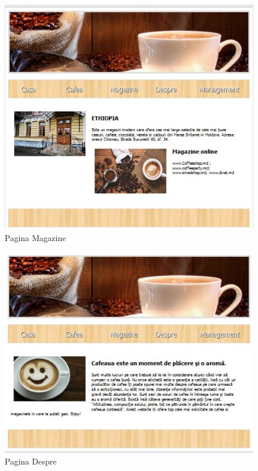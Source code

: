 \begin{figure}[!ht]
	
	\centering
	
	\includegraphics[width=1.0\textwidth]{Cattura2.JPG}
	
	\caption{Pagina Magazine}
	
	\label{Im_label}
	
\end{figure}

\begin{figure}[!ht]
	
	\centering
	
	\includegraphics[width=1.0\textwidth]{Cattura3.JPG}
	
	\caption{Pagina Despre}
	
	\label{Im_label}
	
\end{figure}

